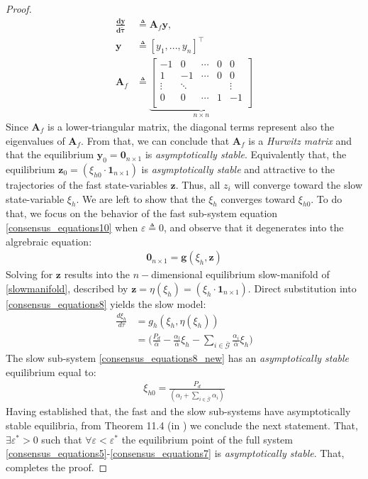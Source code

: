 \documentclass[letterpaper, 10 pt, conference]{ieeeconf}
\newcommand{\matr}[1]{\mathbf{#1}}
\begin{document}
\begin{proof}
\begin{align}
\frac{\matr{dy}}{\matr{d}\bm{\tilde{\tau}}}&\triangleq\matr{A}_f \matr{y},
\label{fastsystem}\\
\matr{y}&\triangleq[y_1,...,y_n]^\top\\
\matr{A}_f&\triangleq\underbrace{\begin{bmatrix}
-1 & 0 & \cdots  & 0 & 0 \\
1 & -1 & \cdots   & 0 & 0 \\
\vdots & \ddots     &  &  & \vdots  \\
0 & 0 & \cdots  & 1 & -1 \\
\end{bmatrix}}_{n\times n}
\end{align}
Since $\matr{A}_f$ is a lower-triangular matrix, the diagonal terms represent also the eigenvalues of $\matr{A}_f$. From that, we can conclude that  $\matr{A}_f$ is a \textit{Hurwitz matrix} and that the equilibrium $\matr{y}_0=\matr{0}_{n\times 1}$ is \textit{asymptotically stable}. Equivalently that, the equilibrium $\matr{z}_0=(\xi_{h0}\cdot \matr{1}_{n\times 1})$ is \textit{asymptotically stable} and attractive to the trajectories of the fast state-variables $\matr{z}$. Thus, all $z_i$ will converge toward the slow state-variable $\xi_h$. We are left to show that the $\xi_h$ converges toward $\xi_{h0}$. To do that, we focus on the behavior of the fast sub-system equation \eqref{consensus_equations10} when $\varepsilon\triangleq 0$, and observe that it degenerates into the algrebraic equation:
\begin{align}
\matr{0}_{n\times 1}=\matr{g}(\xi_h,\matr{z})
\label{slowmanifold}
\end{align}
Solving for $\matr{z}$ results into the  $n-$dimensional equilibrium slow-manifold of \eqref{slowmanifold}, described by $\matr{z}=\eta(\xi_h)=(\xi_h\cdot \matr{1}_{n\times 1})$. Direct substitution into \eqref{consensus_equations8} yields the slow model:
\begin{align}
\frac{d{\xi}_h}{d\tau}&=g_h(\xi_h,\eta(\xi_h))\nonumber\\&=\Big(\frac{P_d}{\bar{\alpha}}-\frac{\alpha_l}{\bar{\alpha}} \xi_h-\sum_{i\in \bar{\mathcal{G}}} \frac{\alpha_i}{\bar{\alpha}} \xi_h\Big)
\label{consensus_equations8_new}
\end{align}
The slow sub-system \eqref{consensus_equations8_new} has an \textit{asymptotically stable} equilibrium equal to:
 \begin{align*}
 \xi_{h0}=\frac{P_d}{(\alpha_l+\sum_{i\in\bar{\mathcal{G}}}\alpha_i)}
 \end{align*}
   Having established that, the fast and the slow sub-systems have asymptotically stable equilibria, from Theorem 11.4 (in \cite{khalil}) we conclude the next statement. That, $\exists\varepsilon^*>0$ such that $\forall\varepsilon<\varepsilon^*$ the equilibrium point of the full system \eqref{consensus_equations5}-\eqref{consensus_equations7} is \textit{asymptotically stable}. That, completes the proof.\end{proof}
 
\end{document}
